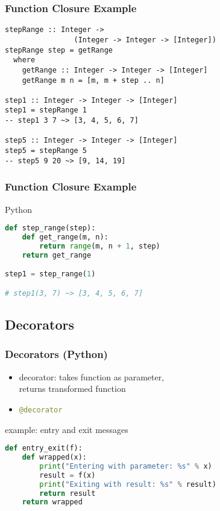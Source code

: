 \documentclass[dvipsnames]{beamer}
\theoremstyle{plain}
\begin{document}
\begin{frame}[fragile]
  \frametitle{Function Closure Example}

  \begin{lstlisting}
stepRange :: Integer ->
                (Integer -> Integer -> [Integer])
stepRange step = getRange
  where
    getRange :: Integer -> Integer -> [Integer]
    getRange m n = [m, m + step .. n]

step1 :: Integer -> Integer -> [Integer]
step1 = stepRange 1
-- step1 3 7 ~> [3, 4, 5, 6, 7]

step5 :: Integer -> Integer -> [Integer]
step5 = stepRange 5
-- step5 9 20 ~> [9, 14, 19]
  \end{lstlisting}
\end{frame}

\begin{frame}[fragile]
  \frametitle{Function Closure Example}

  \begin{exampleblock}{Python}
    \begin{lstlisting}[language=Python]
def step_range(step):
    def get_range(m, n):
        return range(m, n + 1, step)
    return get_range

step1 = step_range(1)

# step1(3, 7) ~> [3, 4, 5, 6, 7]
    \end{lstlisting}
  \end{exampleblock}
\end{frame}

\subsection{Decorators}

\begin{frame}[fragile]
  \frametitle{Decorators (Python)}

  \begin{itemize}
    \item decorator: takes function as parameter,\\
      returns transformed function
    \item \lstinline[language=Python]|@decorator|
  \end{itemize}

  \begin{exampleblock}{example: entry and exit messages}
    \begin{lstlisting}[language=Python]
def entry_exit(f):
    def wrapped(x):
        print("Entering with parameter: %s" % x)
        result = f(x)
        print("Exiting with result: %s" % result)
        return result
    return wrapped
    \end{lstlisting}
  \end{exampleblock}
\end{frame}
\end{document}
